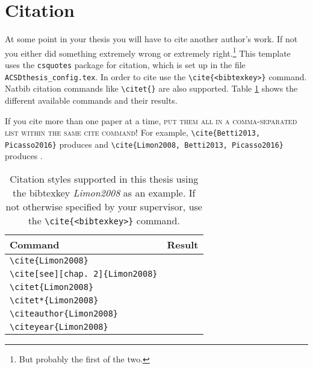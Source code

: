 \section{Citation}
At some point in your thesis you will have to cite another author's work. If not you either did something extremely wrong or extremely right.\footnote{But probably the first of the two.} This template uses the \texttt{csquotes} package for citation, which is set up in the file \texttt{ACSDthesis\_config.tex}. In order to cite use the \texttt{\textbackslash cite\{<bibtexkey>\}} command. Natbib citation commands like \texttt{\textbackslash citet\{\}} are also supported. Table \ref{tab:citation} shows the different available commands and their results.

If you cite more than one paper at a time, \textsc{put them all in a comma-separated list within the same cite command!} For example, \texttt{\textbackslash cite\{Betti2013, Picasso2016\}} produces \cite{Betti2013, Picasso2016} and \texttt{\textbackslash cite\{Limon2008, Betti2013, Picasso2016\}} produces \cite{Limon2008, Betti2013, Picasso2016}.

\begin{table}[H]
\centering
\caption{Citation styles supported in this thesis using the bibtexkey \textit{Limon2008} as an example. If not otherwise specified by your supervisor, use the \texttt{\textbackslash cite\{<bibtexkey>\}} command.} 
\begin{tabular}{l | l }
Command & Result \\ \hline
\texttt{\textbackslash cite\{Limon2008\}}			& \cite{Limon2008}			\\
\texttt{\textbackslash cite[see][chap. 2]\{Limon2008\}} & \cite[see][chap. 2]{Limon2008} \\
\texttt{\textbackslash citet\{Limon2008\}}			& \citet{Limon2008}			\\
\texttt{\textbackslash citet*\{Limon2008\}}		& \citet*{Limon2008}		\\
\texttt{\textbackslash citeauthor\{Limon2008\}}	& \citeauthor{Limon2008}	\\
\texttt{\textbackslash citeyear\{Limon2008\}}		& \citeyear{Limon2008}	
\end{tabular}
\label{tab:citation}
\end{table}

